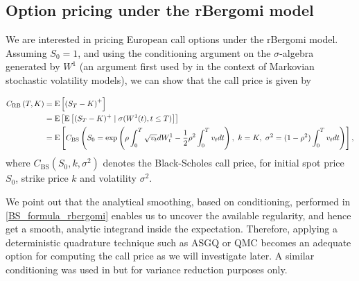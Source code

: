 \subsection{Option pricing under the rBergomi model}\label{sec:Option pricing under rBergomi model}

We are interested in pricing European call options under the rBergomi model. Assuming $S_0 = 1$, and using the conditioning argument on the $\sigma$-algebra generated by $W^1$ (an argument first used by \cite{romano1997contingent} in the context of Markovian stochastic volatility  models), we can  show that the call price is given by

\begin{align}\label{BS_formula_rbergomi}
	C_{\text{RB}}\left( T, K \right) &= \text{E}\left[ \left(S_T - K \right)^+ \right]  \nonumber\\
	&=\mathrm{E}\left[\mathrm{E}\left[(S_T-K)^+ \mid \sigma(W^1(t) ,t \le T)\right]\right]\nonumber \\
	&=\text{E}\left[C_{\text{BS}}\left( S_0 = \operatorname{exp}\left(\rho \int_0^T \sqrt{v_t} dW_t^1 - \frac{1}{2}
	\rho^2 \int_0^T v_t dt\right),\ k = K, \ \sigma^2 = (1-\rho^2)
	\int_0^T v_t dt \right) \right],
\end{align}
where $C_{\text{BS}}(S_0,k,\sigma^2)$ denotes the Black-Scholes call price, for initial spot price $S_0$, strike price $k$ and volatility $\sigma^2$.


We point out that the analytical smoothing, based on conditioning, performed in \eqref{BS_formula_rbergomi} enables us to uncover the available regularity, and hence  get a smooth, analytic integrand inside the expectation. Therefore, applying a deterministic quadrature technique such as ASGQ or QMC becomes an adequate option for computing the call price as we will investigate later. A similar conditioning was used in \cite{mccrickerd2018turbocharging} but for variance reduction purposes only.

